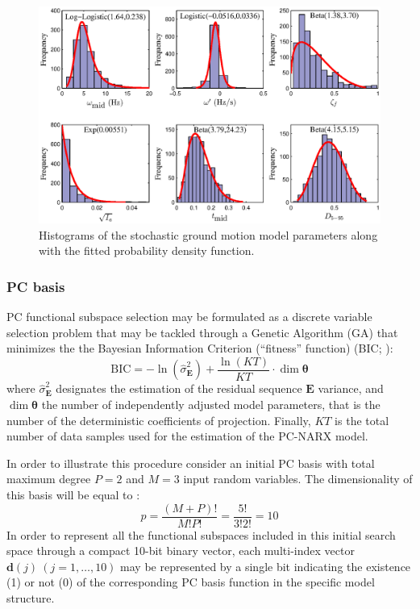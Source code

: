 \documentclass[12pt,a4paper,twocolumn,fleqn]{narms}
\newcommand{\bld}[1]{\boldsymbol{#1}}
\newcommand{\bth}{\bld{\theta}}
\newcommand{\beq}{\begin{equation}}
\newcommand{\eeq}{\end{equation}}
\begin{document}
\begin{figure}[t!]
\centerline{\includegraphics[width=12.5cm]{figs/histfit.eps}}
\caption{Histograms of the stochastic ground motion model parameters along with the fitted probability density function.}\label{fig:histfit}
\end{figure}


\subsubsection{PC basis}
PC functional subspace selection may be formulated as a discrete variable selection problem that may be tackled through a Genetic Algorithm (GA) that minimizes the the Bayesian Information Criterion (``fitness'' function) (BIC; ):
\beq \text{BIC} = -\ln (\hat{\sigma}_{\bld E}^2) + \frac{\ln (KT)}{K T} \cdot \dim{\bth}  \eeq
where $\hat{\sigma}_{\bld E}^2$ designates the estimation of the residual sequence ${\bld E}$ variance, and $\dim{\bth}$ the number of independently adjusted  model parameters, that is the number of the deterministic coefficients of projection. Finally, $K T$ is the total number of data samples used for the estimation of the PC-NARX model. 

In order to illustrate this procedure consider an initial PC basis with total maximum degree $P = 2$ and $M = 3$ input random variables. The dimensionality of this basis will be equal to \cite{Blatman-Sudret2010}:
$$ p = \frac{(M+P) !}{M! P !} = \frac{5!}{3!2!} = 10$$
In order to represent all the functional subspaces included in this initial search space through a compact 10-bit binary vector, each multi-index vector ${\bld d}(j) \ (j =1,\ldots,10)$ may be represented by a single bit indicating the existence (1) or not (0) of the corresponding PC basis function in the specific model structure.
\end{document}
